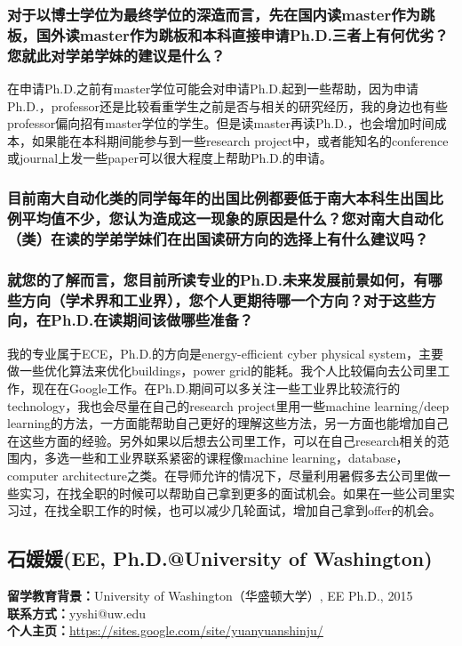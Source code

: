 \documentclass[a4paper,UTF8]{book}
\begin{document}
    \subsubsection*{对于以博士学位为最终学位的深造而言，先在国内读master作为跳板，国外读master作为跳板和本科直接申请Ph.D.三者上有何优劣？您就此对学弟学妹的建议是什么？}
    在申请Ph.D.之前有master学位可能会对申请Ph.D.起到一些帮助，因为申请Ph.D.，professor还是比较看重学生之前是否与相关的研究经历，我的身边也有些professor偏向招有master学位的学生。但是读master再读Ph.D.，也会增加时间成本，如果能在本科期间能参与到一些research project中，或者能知名的conference或journal上发一些paper可以很大程度上帮助Ph.D.的申请。

    \subsubsection*{目前南大自动化类的同学每年的出国比例都要低于南大本科生出国比例平均值不少，您认为造成这一现象的原因是什么？您对南大自动化（类）在读的学弟学妹们在出国读研方向的选择上有什么建议吗？}

    \subsubsection*{就您的了解而言，您目前所读专业的Ph.D.未来发展前景如何，有哪些方向（学术界和工业界），您个人更期待哪一个方向？对于这些方向，在Ph.D.在读期间该做哪些准备？}
    我的专业属于ECE，Ph.D.的方向是energy-efficient cyber physical system，主要做一些优化算法来优化buildings，power grid的能耗。我个人比较偏向去公司里工作，现在在Google工作。在Ph.D.期间可以多关注一些工业界比较流行的technology，我也会尽量在自己的research project里用一些machine learning/deep learning的方法，一方面能帮助自己更好的理解这些方法，另一方面也能增加自己在这些方面的经验。另外如果以后想去公司里工作，可以在自己research相关的范围内，多选一些和工业界联系紧密的课程像machine learning，database，computer architecture之类。在导师允许的情况下，尽量利用暑假多去公司里做一些实习，在找全职的时候可以帮助自己拿到更多的面试机会。如果在一些公司里实习过，在找全职工作的时候，也可以减少几轮面试，增加自己拿到offer的机会。


\clearpage
\subsection{石媛媛(EE, Ph.D.@University of Washington)}
    \textbf{留学教育背景：}University of Washington（华盛顿大学）, EE Ph.D., 2015\\
    \textbf{联系方式：}yyshi@uw.edu\\
    \textbf{个人主页：}\url{https://sites.google.com/site/yuanyuanshinju/}
\end{document}
